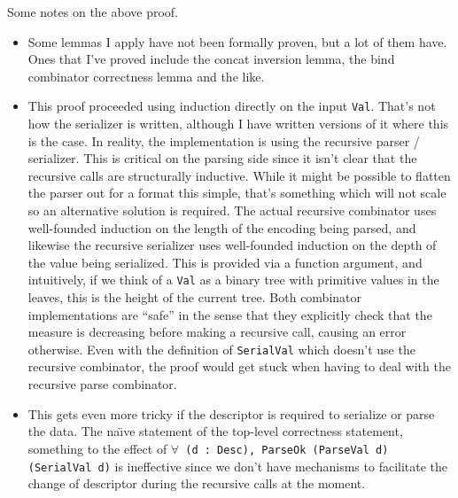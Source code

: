 Some notes on the above proof.
\begin{itemize}
\item Some lemmas I apply have not been formally proven, but a lot of them
  have. Ones that I've proved include the concat inversion lemma, the bind
  combinator correctness lemma and the like.
\item This proof proceeded using induction directly on the input
  \texttt{Val}. That's not how the serializer is written, although I have
  written versions of it where this is the case. In reality, the implementation
  is using the recursive parser / serializer. This is critical on the parsing
  side since it isn't clear that the recursive calls are structurally
  inductive. While it might be possible to flatten the parser out for a format
  this simple, that's something which will not scale so an alternative solution
  is required. The actual recursive combinator uses well-founded induction on
  the length of the encoding being parsed, and likewise the recursive serializer
  uses well-founded induction on the depth of the value being serialized. This
  is provided via a function argument, and intuitively, if we think of a
  \texttt{Val} as a binary tree with primitive values in the leaves, this is the
  height of the current tree. Both combinator implementations are ``safe'' in
  the sense that they explicitly check that the measure is decreasing before
  making a recursive call, causing an error otherwise. Even with the definition
  of \texttt{SerialVal} which doesn't use the recursive combinator, the proof
  would get stuck when having to deal with the recursive parse combinator. 
\item This gets even more tricky if the descriptor is required to serialize or
  parse the data. The na\"\i{}ve statement of the top-level correctness
  statement, something to the effect of \texttt{$\forall$ (d : Desc), ParseOk
    (ParseVal d) (SerialVal d)} is ineffective since we don't have mechanisms to
  facilitate the change of descriptor during the recursive calls at the moment. 
\end{itemize}


